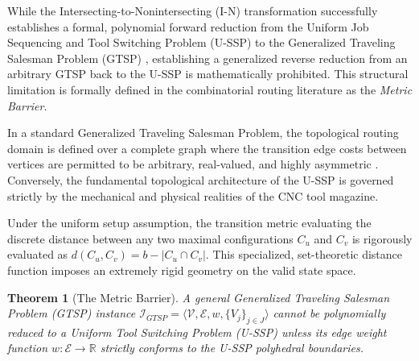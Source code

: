 \documentclass[11pt, a4paper]{book}
\newtheorem{theorem}{Theorem}[chapter]
\begin{document}
	While the Intersecting-to-Nonintersecting (I-N) transformation successfully establishes a formal, polynomial forward reduction from the Uniform Job Sequencing and Tool Switching Problem (U-SSP) to the Generalized Traveling Salesman Problem (GTSP) %
	, establishing a generalized reverse reduction from an arbitrary GTSP back to the U-SSP is mathematically prohibited. This structural limitation is formally defined in the combinatorial routing literature as the \textit{Metric Barrier}.
	
	In a standard Generalized Traveling Salesman Problem, the topological routing domain is defined over a complete graph where the transition edge costs between vertices are permitted to be arbitrary, real-valued, and highly asymmetric %
	. Conversely, the fundamental topological architecture of the U-SSP is governed strictly by the mechanical and physical realities of the CNC tool magazine. 
	
	Under the uniform setup assumption, the transition metric evaluating the discrete distance between any two maximal configurations $C_u$ and $C_v$ is rigorously evaluated as $d(C_u, C_v) = b - |C_u \cap C_v|$. This specialized, set-theoretic distance function imposes an extremely rigid geometry on the valid state space. 
	
	\begin{theorem}[The Metric Barrier]
		A general Generalized Traveling Salesman Problem (GTSP) instance $\mathcal{I}_{GTSP} = \langle \mathcal{V}, \mathcal{E}, w, \{V_j\}_{j \in J} \rangle$ cannot be polynomially reduced to a Uniform Tool Switching Problem (U-SSP) unless its edge weight function $w: \mathcal{E} \to \mathbb{R}$ strictly conforms to the U-SSP polyhedral boundaries.
	\end{theorem}
	
\end{document}
